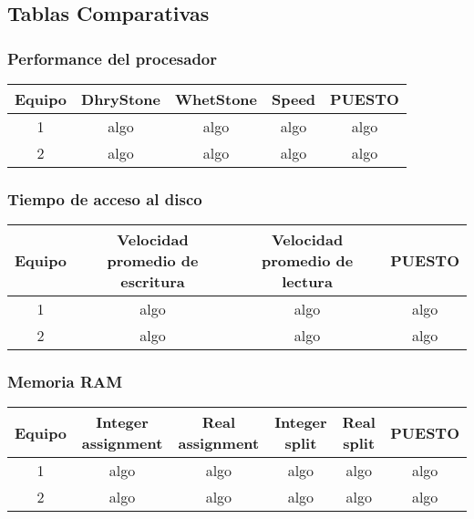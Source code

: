 \subsection{Tablas Comparativas}

\subsubsection{Performance del procesador}
\begin{center}
\begin{tabular}{|ccccc|} \hline
\footnotesize\textbf{Equipo} & \footnotesize\textbf{DhryStone} & \footnotesize\textbf{WhetStone} & \footnotesize\textbf{Speed} & \footnotesize\textbf{PUESTO} \\\hline
1 & algo & algo & algo & algo \\\hline
2 & algo & algo & algo & algo \\\hline
\end{tabular}
\end{center}

\subsubsection{Tiempo de acceso al disco}
\begin{center}
\begin{tabular}{|cccc|} \hline
\footnotesize\textbf{Equipo} & \footnotesize\textbf{Velocidad promedio de escritura} & \footnotesize\textbf{Velocidad promedio de lectura} & \footnotesize\textbf{PUESTO} \\\hline
1 & algo & algo & algo \\\hline
2 & algo & algo & algo \\\hline
\end{tabular}
\end{center}

\subsubsection{Memoria RAM}
\begin{center}
\begin{tabular}{|cccccc|} \hline
\footnotesize\textbf{Equipo} & \footnotesize\textbf{Integer assignment} & \footnotesize\textbf{Real assignment} & \footnotesize\textbf{Integer split} & \footnotesize\textbf{Real split} & \footnotesize\textbf{PUESTO} \\\hline
1 & algo & algo & algo & algo & algo \\\hline
2 & algo & algo & algo & algo & algo \\\hline
\end{tabular}
\end{center}


